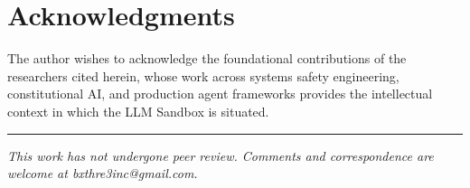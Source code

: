 \documentclass[12pt]{article}
\begin{document}
\section*{Acknowledgments}

The author wishes to acknowledge the foundational contributions of the researchers cited herein, whose work across systems safety engineering, constitutional AI, and production agent frameworks provides the intellectual context in which the LLM Sandbox is situated.




\vspace{2em}
\hrule
\vspace{0.5em}
\noindent\small\textit{This work has not undergone peer review. Comments and correspondence are welcome at bxthre3inc@gmail.com.}
\end{document}
